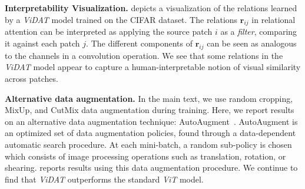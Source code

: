 \begin{table}
    \centering
    
    \vskip5pt
    \caption{Ablation over symmetry of $\bm{r}_{ij}$ in relational attention for image recognition experiments.}\label{tab:cifar_results_symmetry_ablation}
\end{table}

\textbf{Interpretability Visualization.}  depicts a visualization of the relations learned by a \textit{ViDAT} model trained on the CIFAR dataset. The relations $\bm{r}_{ij}$ in relational attention can be interpreted as applying the source patch $i$ as a \textit{filter}, comparing it against each patch $j$. The different components of $\bm{r}_{ij}$ can be seen as analogous to the channels in a convolution operation. We see that some relations in the \textit{ViDAT} model appear to capture a human-interpretable notion of visual similarity across patches.

\textbf{Alternative data augmentation.} In the main text, we use random cropping, MixUp, and CutMix data augmentation during training. Here, we report results on an alternative data augmentation technique: AutoAugment~\citep{cubuk2019autoaugmentlearningaugmentationpolicies}. AutoAugment is an optimized set of data augmentation policies, found through a data-dependent automatic search procedure. At each mini-batch, a random sub-policy is chosen which consists of image processing operations such as translation, rotation, or shearing.  reports results using this data augmentation procedure. We continue to find that \textit{ViDAT} outperforms the standard \textit{ViT} model.

\begin{table}
    \centering
    
    \vskip5pt
    \caption{Classification accuracy on CIFAR-10 and CIFAR-100 with AutoAugment data augmentation during training. Each training configuration is repeated 10 times with different random seeds; we report the mean accuracy $\pm$ the standard error of mean. \textit{DAT} continues to outperform the standard Vision Transformer.}\label{tab:cifar_results_autoaugment}
\end{table}

